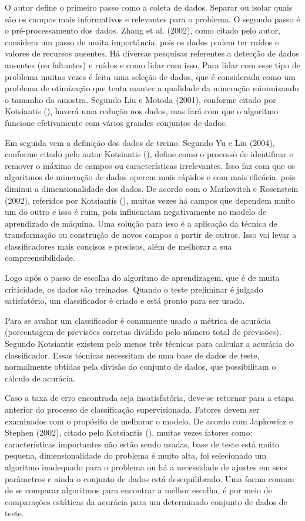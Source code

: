 O autor define o primeiro passo como a coleta de dados. Separar ou isolar quais são os campos mais informativos e relevantes para o problema. O segundo passo é o pré-processamento dos dados. Zhang et al. (2002), como citado pelo autor, considera um passo de muita importância, pois os dados podem ter ruídos e valores de recursos ausentes. Há diversas pesquisas referentes a detecção de dados ausentes (ou faltantes) e ruídos e como lidar com isso. Para lidar com esse tipo de problema muitas vezes é feita uma seleção de dados, que é considerada como um problema de otimização que tenta manter a qualidade da mineração minimizando o tamanho da amostra. Segundo Liu e Motoda (2001), conforme citado por Kotsiantis (\citeyear{Kotsiantis}), haverá uma redução nos dados, mas fará com que o algoritmo funcione efetivamente com vários grandes conjuntos de dados.

Em seguida vem a definição dos dados de treino. Segundo Yu e Liu (2004), conforme citado pelo autor Kotsiantis (\citeyear{Kotsiantis}), define como o processo de identificar e remover o máximo de campos ou características irrelevantes. Isso faz com que os algoritmos de mineração de dados operem mais rápidos e com mais eficácia, pois diminui a dimensionalidade dos dados. De acordo com o Markovitch e Rosenstein (2002), referidos por Kotsiantis (\citeyear{Kotsiantis}), muitas vezes há campos que dependem muito um do outro e isso é ruim, pois influenciam negativamente no modelo de aprendizado de máquina. Uma solução para isso é a aplicação da técnica de transformação ou construção de novos campos a partir de outros. Isso vai levar a classificadores mais concisos e precisos, além de melhorar a sua compreensibilidade.

Logo após o passo de escolha do algoritmo de aprendizagem, que é de muita criticidade, os dados são treinados. Quando o teste preliminar é julgado satisfatório, um classificador é criado e está pronto para ser usado.

Para se avaliar um classificador é comumente usado a métrica de acurácia (porcentagem de previsões corretas dividido pelo número total de previsões). Segundo Kotsiantis \citeyear{Kotsiantis} existem pelo menos três técnicas para calcular a acurácia do classificador. Essas técnicas necessitam de uma base de dados de teste, normalmente obtidas pela divisão do conjunto de dados, que possibilitam o cálculo de acurácia.

Caso a taxa de erro encontrada seja insatisfatória, deve-se retornar para a etapa anterior do processo de classificação supervisionada. Fatores devem ser examinados com o propósito de melhorar o modelo. De acordo com Japkowicz e Stephen (2002), citado pelo Kotsiantis (\citeyear{Kotsiantis}), muitas vezes fatores como: características importantes não estão sendo usadas, base de teste está muito pequena, dimensionalidade do problema é muito alta, foi selecionado um algoritmo inadequado para o problema ou há a necessidade de ajustes em seus parâmetros e ainda o conjunto de dados está desequilibrado. Uma forma comum de se comparar algoritmos para encontrar a melhor escolha, é por meio de comparações estáticas da acurácia para um determinado conjunto de dados de teste.

